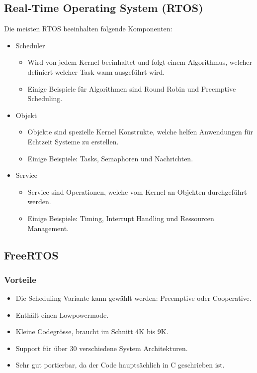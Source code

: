 \subsection{Real-Time Operating System (RTOS)}
Die meisten RTOS beeinhalten folgende Komponenten:
\begin{itemize}
    \item Scheduler
    \begin{itemize}
        \item Wird von jedem Kernel beeinhaltet und folgt einem Algorithmus, welcher definiert welcher Task wann ausgeführt wird.
        \item Einige Beispiele für Algorithmen sind Round Robin und Preemptive Scheduling.
    \end{itemize}
    \item Objekt
    \begin{itemize}
        \item Objekte sind spezielle Kernel Konstrukte, welche helfen Anwendungen für Echtzeit Systeme zu erstellen.
        \item Einige Beispiele: Tasks, Semaphoren und Nachrichten.
    \end{itemize}
    \item Service
    \begin{itemize}
        \item Service sind Operationen, welche vom Kernel an Objekten durchgeführt werden.
        \item Einige Beispiele: Timing, Interrupt Handling und Ressourcen Management.
    \end{itemize}
\end{itemize}

\subsection{FreeRTOS}
\subsubsection{Vorteile}
\begin{itemize}
    \item Die Scheduling Variante kann gewählt werden: Preemptive oder Cooperative.
    \item Enthält einen Lowpowermode.
    \item Kleine Codegrösse, braucht im Schnitt 4K bis 9K.
    \item Support für über 30 verschiedene System Architekturen.
    \item Sehr gut portierbar, da der Code hauptsächlich in C geschrieben ist.
\end{itemize}


